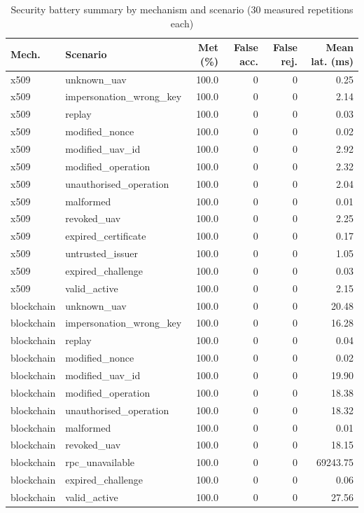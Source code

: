 \begin{table}[htbp]
    \centering
    \caption{Security battery summary by mechanism and scenario (30 measured repetitions each)}
    \label{tab:ch5-security-summary}
    \footnotesize
    \begin{tabular}{|l|l|r|r|r|r|}
        \hline
        \textbf{Mech.} & \textbf{Scenario} & \textbf{Met (\%)} & \textbf{False acc.} & \textbf{False rej.} & \textbf{Mean lat. (ms)} \\
        \hline
        x509 & unknown\_uav & 100.0 & 0 & 0 & 0.25 \\
        x509 & impersonation\_wrong\_key & 100.0 & 0 & 0 & 2.14 \\
        x509 & replay & 100.0 & 0 & 0 & 0.03 \\
        x509 & modified\_nonce & 100.0 & 0 & 0 & 0.02 \\
        x509 & modified\_uav\_id & 100.0 & 0 & 0 & 2.92 \\
        x509 & modified\_operation & 100.0 & 0 & 0 & 2.32 \\
        x509 & unauthorised\_operation & 100.0 & 0 & 0 & 2.04 \\
        x509 & malformed & 100.0 & 0 & 0 & 0.01 \\
        x509 & revoked\_uav & 100.0 & 0 & 0 & 2.25 \\
        x509 & expired\_certificate & 100.0 & 0 & 0 & 0.17 \\
        x509 & untrusted\_issuer & 100.0 & 0 & 0 & 1.05 \\
        x509 & expired\_challenge & 100.0 & 0 & 0 & 0.03 \\
        x509 & valid\_active & 100.0 & 0 & 0 & 2.15 \\
        \hline
        blockchain & unknown\_uav & 100.0 & 0 & 0 & 20.48 \\
        blockchain & impersonation\_wrong\_key & 100.0 & 0 & 0 & 16.28 \\
        blockchain & replay & 100.0 & 0 & 0 & 0.04 \\
        blockchain & modified\_nonce & 100.0 & 0 & 0 & 0.02 \\
        blockchain & modified\_uav\_id & 100.0 & 0 & 0 & 19.90 \\
        blockchain & modified\_operation & 100.0 & 0 & 0 & 18.38 \\
        blockchain & unauthorised\_operation & 100.0 & 0 & 0 & 18.32 \\
        blockchain & malformed & 100.0 & 0 & 0 & 0.01 \\
        blockchain & revoked\_uav & 100.0 & 0 & 0 & 18.15 \\
        blockchain & rpc\_unavailable & 100.0 & 0 & 0 & 69243.75 \\
        blockchain & expired\_challenge & 100.0 & 0 & 0 & 0.06 \\
        blockchain & valid\_active & 100.0 & 0 & 0 & 27.56 \\
        \hline
    \end{tabular}
\end{table}

